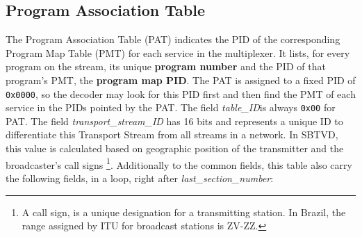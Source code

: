 \documentclass[
	12pt,				%
	openright,			%
	twoside,			%
	a4paper,			%
	brazil,
	french,				%
	english
	]{abntex2}
\begin{document}

\subsection{Program Association Table}

The Program Association Table (PAT) indicates the PID of the corresponding Program Map Table (PMT) for each service in the multiplexer. It lists, for every program on the stream, its unique \textbf{program number} and the PID of that program's PMT, the \textbf{program map PID}. The PAT is assigned to a fixed PID of \texttt{0x0000}, so the decoder may look for this PID first and then find the PMT of each service in the PIDs pointed by the PAT. The field \textit{table\_ID}is always \texttt{0x00} for PAT. The field \textit{transport\_stream\_ID} has 16 bits and represents a unique ID to differentiate this Transport Stream from all streams in a network. In SBTVD, this value is calculated based on geographic position of the transmitter and the broadcaster's call signs \footnote{A call sign, is a unique designation for a transmitting station. In Brazil, the range assigned by ITU for broadcast stations is ZV-ZZ\cite{anatel}.}. Additionally to the common fields, this table also carry the following fields, in a loop, right after \textit{last\_section\_number}:
\end{document}
